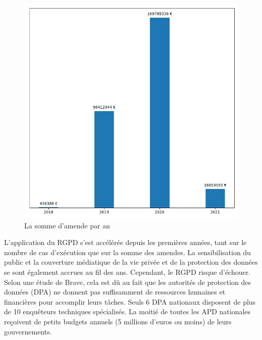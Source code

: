 \documentclass[french]{article}
\begin{document}
	\begin{multicols}{2}
	\begin{figure}
		[H]\centering\includegraphics[width=1.0\linewidth]{graphs/SumOfFinesperYear}
		\caption{La somme d'amende par an }
	 \end{figure}
\justify
	L'application du RGPD s'est accélérée depuis les premières années, tant sur le nombre de cas d'exécution que sur la somme des amendes. La sensibilisation du public et la couverture médiatique de la vie privée et de la protection des données se sont également accrues au fil des ans. Cependant, le RGPD risque d'échouer. Selon une étude de Brave, cela est dû au fait que les autorités de protection des données (DPA) ne donnent pas suffisamment de ressources humaines et financières pour accomplir leurs tâches. Seuls 6 DPA nationaux disposent de plus de 10 enquêteurs techniques spécialisés. La moitié de toutes les APD nationales reçoivent de petits budgets annuels (5 millions d'euros ou moins) de leurs gouvernements.
	\end{multicols}



\newpage



\end{document}
